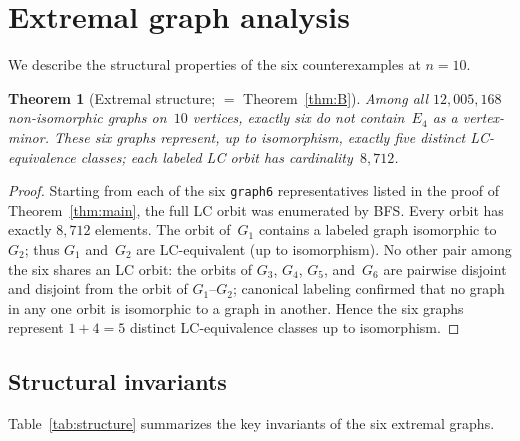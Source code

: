 \documentclass[11pt]{amsart}
\newtheorem{theorem}{Theorem}[section]
\theoremstyle{definition}
\theoremstyle{remark}
\begin{document}
\section{Extremal graph analysis}\label{sec:extremal}

We describe the structural properties of the six counterexamples at
$n=10$.

\begin{theorem}[Extremal structure; {$=$ Theorem~\ref{thm:B}}]\label{thm:extremal}
  Among all $12{,}005{,}168$ non-isomorphic graphs on~$10$ vertices,
  exactly six do not contain~$E_4$ as a vertex-minor.  These six graphs
  represent, up to isomorphism, exactly five distinct
  LC-equivalence classes; each labeled LC orbit has
  cardinality~$8{,}712$.
\end{theorem}

\begin{proof}
  Starting from each of the six \texttt{graph6} representatives listed
  in the proof of Theorem~\ref{thm:main}, the full LC orbit was
  enumerated by BFS\@.  Every orbit has exactly $8{,}712$ elements.  The
  orbit of~$G_1$ contains a labeled graph isomorphic to~$G_2$; thus
  $G_1$ and~$G_2$ are LC-equivalent (up to isomorphism).  No other pair
  among the six shares an LC orbit: the orbits of $G_3$, $G_4$, $G_5$,
  and~$G_6$ are pairwise disjoint and disjoint from the orbit of
  $G_1$--$G_2$; canonical labeling confirmed that no graph in any
  one orbit is isomorphic to a graph in another.  Hence the
  six graphs represent $1+4=5$ distinct LC-equivalence classes up to
  isomorphism.
\end{proof}


\subsection{Structural invariants}

Table~\ref{tab:structure} summarizes the key invariants of the six
extremal graphs.
\end{document}
